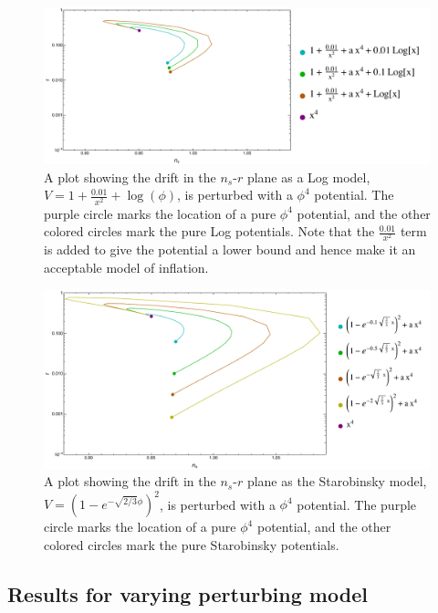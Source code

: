 \documentclass[a4paper,11pt]{article}
\def\nsr{$n_s$-$r$ }
\begin{document}
\begin{figure}[h!]
	\centering
	\includegraphics[width=\textwidth]{figures/LFP_lines_Log_final.pdf}
	\caption[Drift in \nsr plane for Log model with perturbations.]{A plot showing the drift in the \nsr plane as a Log model, $V=1+\tfrac{0.01}{x^2}+\log(\phi)$, is perturbed with a $\phi^4$ potential. The purple circle marks the location of a pure $\phi^4$ potential, and the other colored circles mark the pure Log potentials. Note that the $\tfrac{0.01}{x^2}$ term is added to give the potential a lower bound and hence make it an acceptable model of inflation.}
	\label{fig:LFP_Log_drift}
\end{figure}

\begin{figure}[h!]
	\centering
	\includegraphics[width=\textwidth]{figures/LFP_lines_Rsq_final.pdf}
	\caption[Drift in \nsr plane for Starobinsky model with perturbations.]{A plot showing the drift in the \nsr plane as the Starobinsky model, $V=(1-e^{-\sqrt{2/3}\phi})^2$, is perturbed with a $\phi^4$ potential. The purple circle marks the location of a pure $\phi^4$ potential, and the other colored circles mark the pure Starobinsky potentials.}
	\label{fig:LFP_Rsq_drift}
\end{figure}

\FloatBarrier
\subsection{Results for varying perturbing model}
\label{ssec:DriftVaryAf}
\end{document}
